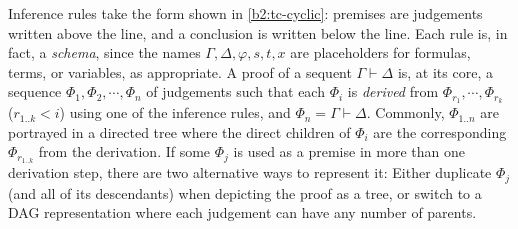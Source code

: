 Inference rules take the form shown in \autoref{b2:tc-cyclic}: premises are judgements written above the line, and a conclusion is written below the line.
Each rule is, in fact, a \emph{schema}, since the names $\Gamma, \Delta, \varphi, s, t, x$ \etc are placeholders for formulas, terms, or variables, as appropriate.
A proof of a sequent $\Gamma\vdash\Delta$ is, at its core, a sequence $\Phi_1, \Phi_2, {\cdots}, \Phi_n$ of judgements such that each $\Phi_i$ is \emph{derived} from $\Phi_{r_1}, {\cdots}, \Phi_{r_k}$ ($r_{1..k} < i$) using one of the inference rules, and $\Phi_n = \Gamma\vdash\Delta$.
Commonly, $\Phi_{1..n}$ are portrayed in a directed tree where the direct children of $\Phi_i$ are the corresponding $\Phi_{r_{1..k}}$ from the derivation.
If some $\Phi_j$ is used as a premise in more than one derivation step,
there are two alternative ways to represent it:
Either duplicate $\Phi_j$ (and all of its descendants) when depicting the proof as a tree, or switch to a DAG representation where each judgement can have any number of parents.

